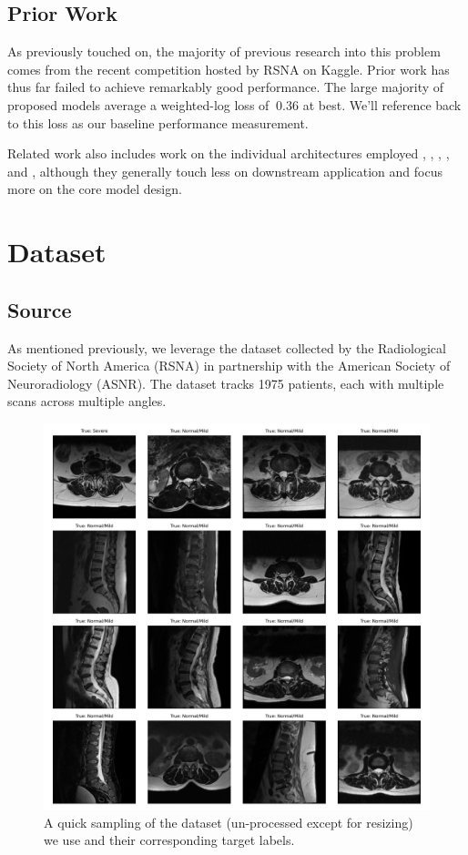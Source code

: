 \documentclass[conference]{IEEEtran}
\begin{document}
\subsection{Prior Work}
As previously touched on, the majority of previous research into this problem comes from the recent competition hosted by RSNA on Kaggle. Prior work has thus far failed to achieve remarkably good performance. The large majority of proposed models average a weighted-log loss of $~0.36$ at best. We'll reference back to this loss as our baseline performance measurement.

Related work also includes work on the individual architectures employed \cite{convnet}, \cite{resnet}, \cite{transformer}, \cite{unet}, and \cite{kan}, although they generally touch less on downstream application and focus more on the core model design.

\section{Dataset}
\subsection{Source}
As mentioned previously, we leverage the dataset collected by the Radiological Society of North America (RSNA) in partnership with the American Society of Neuroradiology (ASNR). The dataset tracks 1975 patients, each with multiple scans across multiple angles.

\begin{figure}
    \centering
    \includegraphics[width=0.8\linewidth]{visuals/dataset_sample_no_preds.png}
    \caption{A quick sampling of the dataset (un-processed except for resizing) we use and their corresponding target labels.}
    \label{fig:data_sample}
\end{figure}
\end{document}
